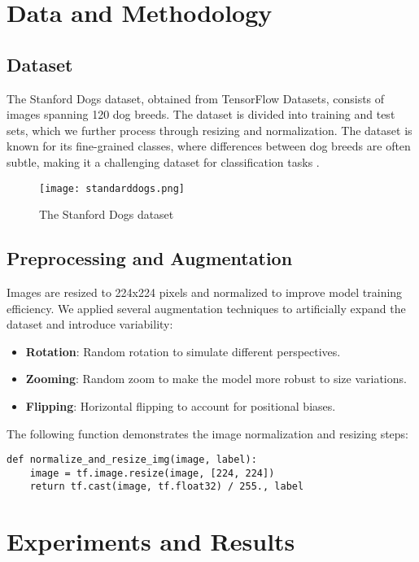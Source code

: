 \documentclass[12pt]{article}
\begin{document}
\section{Data and Methodology}

\subsection{Dataset}
The Stanford Dogs dataset, obtained from TensorFlow Datasets, consists of images spanning 120 dog breeds. The dataset is divided into training and test sets, which we further process through resizing and normalization. The dataset is known for its fine-grained classes, where differences between dog breeds are often subtle, making it a challenging dataset for classification tasks \cite{standarddogs.png}.

\begin{figure}[h!]
\centering
\texttt{[image: standarddogs.png]}
\caption{The Stanford Dogs dataset}
\end{figure}

\subsection{Preprocessing and Augmentation}
Images are resized to 224x224 pixels and normalized to improve model training efficiency. We applied several augmentation techniques to artificially expand the dataset and introduce variability:

\begin{itemize}
    \item \textbf{Rotation}: Random rotation to simulate different perspectives.
    \item \textbf{Zooming}: Random zoom to make the model more robust to size variations.
    \item \textbf{Flipping}: Horizontal flipping to account for positional biases.
\end{itemize}

The following function demonstrates the image normalization and resizing steps:

\begin{verbatim}
def normalize_and_resize_img(image, label):
    image = tf.image.resize(image, [224, 224])
    return tf.cast(image, tf.float32) / 255., label
\end{verbatim}

\section{Experiments and Results}
\end{document}
